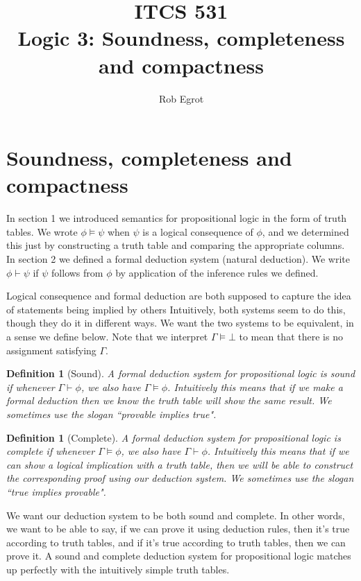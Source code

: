 \documentclass{article}
\title{ITCS 531 \\Logic 3: Soundness, completeness and compactness}
\author{Rob Egrot}
\date{}
\theoremstyle{plain}
\newtheorem{definition}[theorem]{Definition}{\bfseries}{\upshape}
\begin{document}
\maketitle

\section{Soundness, completeness and compactness}
In section 1 we introduced semantics for propositional logic in the form of truth tables. We wrote $\phi\models \psi$ when $\psi$ is a logical consequence of $\phi$,  and we determined this just by constructing a truth table and comparing the appropriate columns. In section 2 we defined a formal deduction system (natural deduction). We write $\phi\vdash \psi$ if $\psi$ follows from $\phi$ by application of the inference rules we defined. 

Logical consequence and formal deduction are both supposed to capture the idea of statements being implied by others Intuitively, both systems seem to do this, though they do it in different ways. We want the two systems to be equivalent, in a sense we define below. Note that we interpret $\Gamma\models\bot$ to mean that there is no assignment satisfying $\Gamma$.


\begin{definition}[Sound]
A formal deduction system for propositional logic is \emph{sound} if whenever $\Gamma\vdash \phi$, we also have $\Gamma\models \phi$. Intuitively this means that if we make a formal deduction then we know the truth table will show the same result. We sometimes use the slogan ``provable implies true". 
\end{definition}   

\begin{definition}[Complete]
A formal deduction system for propositional logic is \emph{complete} if whenever $\Gamma\models \phi$, we also have $\Gamma\vdash \phi$. Intuitively this means that if we can show a logical implication with a truth table, then we will be able to construct the corresponding proof using our deduction system. We sometimes use the slogan ``true implies provable". 
\end{definition}

We want our deduction system to be both sound and complete. In other words, we want to be able to say, if we can prove it using deduction rules, then it's true according to truth tables, and if it's true according to truth tables, then we can prove it. A sound and complete deduction system for propositional logic matches up perfectly with the intuitively simple truth tables. 
\end{document}
